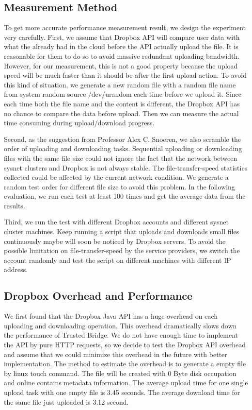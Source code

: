 
\subsection{Measurement Method}
To get more accurate performance measurement result, we design the experiment very carefully. First, we assume that Dropbox API will compare user data with what the already had in the cloud before the API actually upload the file. It is reasonable for them to do so to avoid massive redundant uploading bandwidth. However, for our measurement, this is not a good property because the upload speed will be much faster than it should be after the first upload action. To avoid this kind of situation, we generate a new random file with a random file name from system random source /dev/urandom each time before we upload it. Since each time both the file name and the content is different, the Dropbox API has no chance to compare the data before upload. Then we can measure the actual time consuming during upload/download progress.

Second, as the suggestion from Professor Alex C. Snoeren, we also scramble the order of uploading and downloading tasks. Sequential uploading or downloading files with the same file size could not ignore the fact that the network between sysnet clusters and Dropbox is not always stable. The file-transfer-speed statistics collected could be affected by the current network condition. We generate a random test order for different file size to avoid this problem. In the following evaluation, we run each test at least 100 times and get the average data from the results.

Third, we run the test with different Dropbox accounts and different sysnet cluster machines. Keep running a script that uploads and downloads small files continuously maybe will soon be noticed by Dropbox servers. To avoid the possible limitation on file-transfer-speed by the service providers, we switch the account randomly and test the script on different machines with different IP address.

\subsection{Dropbox Overhead and Performance}
We first found that the Dropbox Java API has a huge overhead on each uploading and downloading operation. This overhead dramatically slows down the performance of Trusted Bridge. We do not have enough time to implement the API by pure HTTP requests, so we decide to test the Dropbox API overhead and assume that we could minimize this overhead in the future with better implementation. The method to estimate the overhead is to generate a empty file by linux touch command. The file will be created with 0 Byte disk occupation and online contains metadata information. The average upload time for one single upload task with one empty file is 3.45 seconds. The average download time for the same file just uploaded is 3.12 second. 

